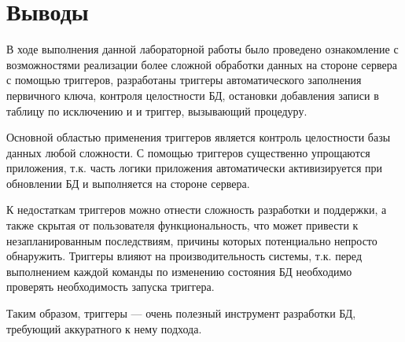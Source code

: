 \section{Выводы}

В ходе выполнения данной лабораторной работы было проведено ознакомление с возможностями реализации более сложной обработки данных на стороне сервера с помощью триггеров, разработаны триггеры автоматического заполнения первичного ключа, контроля целостности БД, остановки добавления записи в таблицу по исключению и и триггер, вызывающий процедуру.

Основной областью применения триггеров является контроль целостности базы данных любой сложности. С помощью триггеров существенно упрощаются приложения, т.к. часть логики приложения автоматически активизируется при обновлении БД и выполняется на стороне сервера.

К недостаткам триггеров можно отнести сложность разработки и поддержки, а также скрытая от пользователя функциональность, что может привести к незапланированным последствиям, причины которых потенциально непросто обнаружить. Триггеры влияют на производительность системы, т.к. перед выполнением каждой команды по изменению состояния БД необходимо проверять необходимость запуска триггера.

Таким образом, триггеры --- очень полезный инструмент разработки БД, требующий аккуратного к нему подхода.